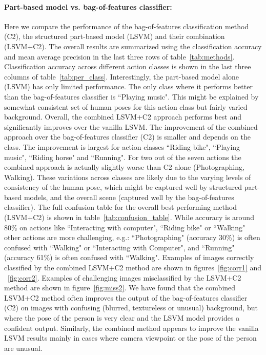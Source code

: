 \documentclass{bmvc2k}
\begin{document}
\paragraph{Part-based model vs. bag-of-features classifier:}
Here we compare the performance of the bag-of-features classification
method (C2),
the structured part-based model (LSVM) and their combination (LSVM+C2).
The overall results are summarized using the classification accuracy
and mean average precision in the last three rows of
table~\ref{tab:methods}. Classification accuracy across different
action classes is shown in the last three columns of
table~\ref{tab:per_class}. Interestingly, the part-based model alone
(LSVM) has only limited performance.
The only class where it performs better than the bag-of-features
classifier is ``Playing music".
This might be explained by somewhat consistent set  of human poses for
this action class but fairly varied background.
Overall, the combined LSVM+C2 approach performs best and significantly
improves over the vanilla LSVM.
The improvement of the combined approach over the bag-of-features
classifier (C2) is smaller and depends on the class.
The improvement is largest for action classes ``Riding bike",
``Playing music", ``Riding horse" and ``Running".
For two out of the seven actions the combined approach is actually
slightly worse than C2 alone (Photographing, Walking).
These variations across classes are likely due to the varying levels
of consistency of the human pose, which might be captured well by
structured part-based models, and the overall scene (captured well by
the bag-of-features classifier).
The full confusion table for the overall best performing method
(LSVM+C2) is shown in table~\ref{tab:confusion_table}.
While accuracy is around 80\% on actions like ``Interacting with
computer", ``Riding bike" or ``Walking" other
actions are more challenging, e.g.: ``Photographing" (accuracy 30\%)
is often confused with ``Walking" or ``Interacting with Computer", and
``Running" (accuracy 61\%) is often confused with ``Walking".
Examples of images correctly classified by the combined LSVM+C2 method
are shown in figures~\ref{fig:corr1} and ~\ref{fig:corr2}.
Examples of challenging images misclassified by the LSVM+C2 method are
shown in figure~\ref{fig:miss2}.
We have found that the combined LSVM+C2 method often improves the
output of  the bag-of-features
 classifier (C2) on images with confusing (blurred, textureless or
unusual) background, but where the pose of the person
is very clear and  the LSVM model provides a confident output.
Similarly, the combined method appears to improve the vanilla LSVM
results mainly in cases where camera viewpoint or the pose of the
person are unusual.
\end{document}

